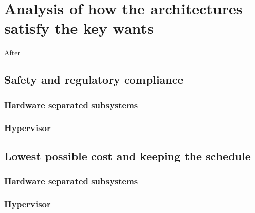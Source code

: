 
\chapter{Analysis of how the architectures satisfy the key wants} %

\label{Chapter4} %


\newcommand{\keyword}[1]{\textbf{#1}}
\newcommand{\tabhead}[1]{\textbf{#1}}
\newcommand{\code}[1]{\texttt{#1}}
\newcommand{\file}[1]{\texttt{\bfseries#1}}
\newcommand{\option}[1]{\texttt{\itshape#1}}


After 

\section{Safety and regulatory compliance}
\subsection{Hardware separated subsystems}
\subsection{Hypervisor}


\section{Lowest possible cost and keeping the schedule}
\subsection{Hardware separated subsystems}
\subsection{Hypervisor}


